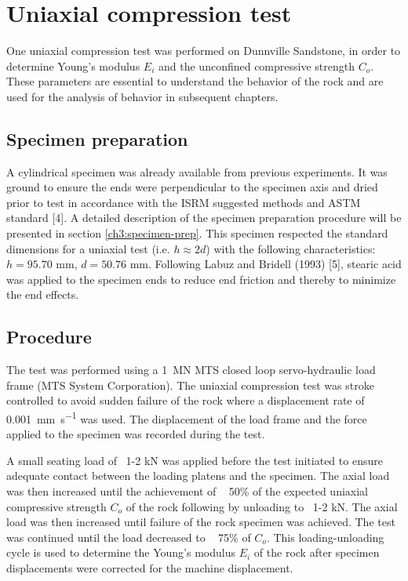 \section{Uniaxial compression test}

One uniaxial compression test was performed on Dunnville Sandstone, in order to determine Young’s modulus $E_i$ and the unconfined compressive strength $C_o$. These parameters are essential to understand the behavior of the rock and are used for the analysis of behavior in subsequent chapters.

\subsection{Specimen preparation}

A cylindrical specimen was already available from previous experiments. It was ground to ensure the ends were perpendicular to the specimen axis and dried prior to test in accordance with the ISRM suggested methods \cite{ISRM2015} and ASTM standard \cite{ASTM2019} [4]. A detailed description of the specimen preparation procedure will be presented in section \ref{ch3:specimen-prep}. This specimen respected the standard dimensions for a uniaxial test (i.e. $h\approx 2d$) with the following characteristics: $h = 95.70$ mm, $d = 50.76$ mm. Following Labuz and Bridell (1993) [5], stearic acid was applied to the specimen ends to reduce end friction and thereby to minimize the end effects.

\subsection{Procedure}

The test was performed using a \SI{1}{\mega\newton} MTS closed loop servo-hydraulic load frame (MTS System Corporation). The uniaxial compression test was stroke controlled to avoid sudden failure of the rock where a displacement rate of \SI{0.001}{\milli\meter\per\second} was used. The displacement of the load frame and the force applied to the specimen was recorded during the test.

A small seating load of ~1-2 kN was applied before the test initiated to ensure adequate contact between the loading platens and the specimen. The axial load was then increased until the achievement of ~ 50\% of the expected uniaxial compressive strength $C_o$ of the rock following by unloading to ~1-2 \si{kN}. The axial load was then increased until failure of the rock specimen was achieved. The test was continued until the load decreased to ~ 75\% of $C_o$. This loading-unloading cycle is used to determine the Young’s modulus $E_i$ of the rock after specimen displacements were corrected for the machine displacement.

